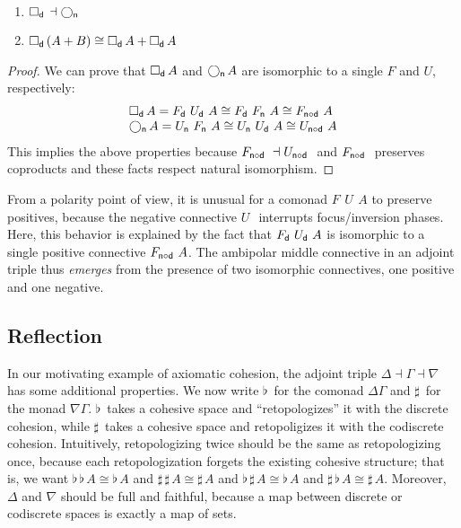 \documentclass{drl-common/llncs}
\newcommand{\la}{\ensuremath{\dashv}}
\newcommand\compo[2]{\ensuremath{#1 \circ #2}}
\newcommand\F[2]{\ensuremath{F_{#1} \,\, #2}}
\newcommand\U[2]{\ensuremath{U_{#1} \,\, #2}}
\newcommand\coprd[2]{\ensuremath{#1 + #2}}
\newcommand\Bx[2]{\ensuremath{\Box_{#1} \, {#2}}}
\newcommand\Crc[2]{\ensuremath{\bigcirc_{#1} \, {#2}}}
\newcommand\Flat[1]{\ensuremath{\flat \, {#1}}}
\newcommand\Sharp[1]{\ensuremath{\sharp \, {#1}}}
\newcommand\iso{\cong}
\begin{document}
\begin{theorem} \label{thm:adjointtriple}
\begin{enumerate}
\item $\Bx{\dsd{d}}{} \la \Crc{\dsd{n}}{}$ 
\item $\Bx{\dsd{d}}{(\coprd A B)} \iso \coprd{\Bx{\dsd{d}}{A}}{\Bx{\dsd{d}}{A}}$
\end{enumerate}
\end{theorem}

\begin{proof}
We can prove that \Bx{\dsd d}{A} and \Crc{\dsd n}{A} are isomorphic to a
single $F$ and $U$, respectively:
\[
\begin{array}{l}
\Bx{\dsd d}{A} = \F{\dsd{d}}{\U{\dsd d}{A}} \cong \F{\dsd d}{\F{\dsd n}{A}} \cong \F{\compo{\dsd{n}}{\dsd{d}}}{A}\\
\Crc{\dsd{n}}{A} = \U{\dsd{n}}{\F{\dsd n}{A}} \cong \U{\dsd n}{\U{\dsd d}{A}} \cong \U{\compo{\dsd{n}}{\dsd d}}{A}
\end{array}
\]
This implies the above properties because
$\F{\compo{\dsd{n}}{\dsd{d}}}{} \la \U{\compo{\dsd{n}}{\dsd d}}{}$ and
$\F{\compo{\dsd{n}}{\dsd{d}}}$ preserves coproducts and these facts
respect natural isomorphism.
\end{proof}

From a polarity point of view, it is unusual for a comonad
$\F{}{\U{}{A}}$ to preserve positives, because the negative connective
$\U{}{}$ interrupts focus/inversion phases.  Here, this behavior is
explained by the fact that $\F{\dsd{d}}{\U{\dsd{d}}{A}}$ is isomorphic
to a single positive connective $\F{\compo{\dsd n}{\dsd d}}{A}$.  The
ambipolar middle connective in an adjoint triple thus \emph{emerges}
from the presence of two isomorphic connectives, one positive and one
negative.

\subsection{Reflection}

In our motivating example of axiomatic cohesion, the adjoint triple
$\Delta \la \Gamma \la \nabla$ has some additional properties.  We now
write $\Flat{}$ for the comonad $\Delta\Gamma$ and $\Sharp{}$ for the
monad $\nabla\Gamma$. $\Flat{}$ takes a cohesive space and
``retopologizes'' it with the discrete cohesion, while $\Sharp{}$ takes
a cohesive space and retopoligizes it with the codiscrete cohesion.
Intuitively, retopologizing twice should be the same as retopologizing
once, because each retopologization forgets the existing cohesive
structure; that is, we want $\Flat{\Flat{A}} \iso \Flat A$ and
$\Sharp{\Sharp{A}} \iso \Sharp A$ and $\Flat{\Sharp{A}} \iso \Flat A$ and
$\Sharp{\Flat{A}} \iso \Sharp A$.  Moreover, $\Delta$ and $\nabla$ should
be full and faithful, because a map between discrete or codiscrete
spaces is exactly a map of sets.
\end{document}
